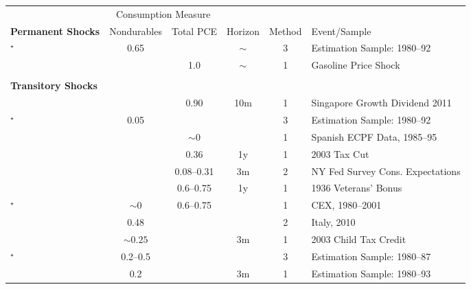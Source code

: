 \scriptsize
\begin{tabular}{p{8cm}ccccl}
\toprule
&  \multicolumn{2}{c}{Consumption Measure}&&&\\
\cmidrule(r){2-3}
\textbf{Permanent Shocks} & \multicolumn{1}{c}{Nondurables} & \multicolumn{1}{c}{Total PCE}& Horizon & Method & Event/Sample \\
\midrule
\citet{blundell_consumption_2008}$^\star$ & 0.65& & $\sim$ & 3  & Estimation Sample: 1980--92\\
\citet{gelman_response_2016} &  & 1.0 & $\sim$ & 1  & Gasoline Price Shock \\
\\
\textbf{Transitory Shocks} \\
\midrule
\citet{agarwal_consumption_2014} &  & 0.90 & 10m & 1 & Singapore Growth Dividend 2011 \\
\citet{blundell_consumption_2008}$^\star$ & 0.05& & & 3  & Estimation Sample: 1980--92\\
\citet{browningCollado:AntIncChanges} &  & \multicolumn{1}{c}{$\sim0$} && 1& Spanish ECPF Data, 1985--95\\
\citet{coronadoEtAl} & & \multicolumn{1}{c}{0.36} & 1y & 1 &2003 Tax Cut\\
\citet{fuster_what_2018} & & \multicolumn{1}{c}{0.08--0.31}   & 3m & 2 & NY Fed Survey Cons. Expectations\\
\citet{hausmanVeteransBonus} & &   \multicolumn{1}{c}{0.6--0.75} & 1y & 1 & 1936 Veterans' Bonus\\
\citet{hsieh:alaska}$^\star$ & \multicolumn{1}{c}{$\sim0$}  &  \multicolumn{1}{c}{0.6--0.75} & & 1  & CEX, 1980--2001\\
\citet{jappelli_fiscal_2014} & \multicolumn{1}{c}{0.48} & & & 2  & Italy, 2010 \\
\citet{johnsonEtAl:2003childTaxCredit} & \multicolumn{1}{c}{$\sim0.25$} &  & 3m & 1  & 2003 Child Tax Credit \\
\citet{lusardi}$^\star$ & \multicolumn{1}{c}{0.2--0.5} & & & 3  & Estimation Sample: 1980--87\\
\citet{parkerSocSec} & 0.2 &  & 3m & 1  & Estimation Sample: 1980--93\\

\end{tabular}
